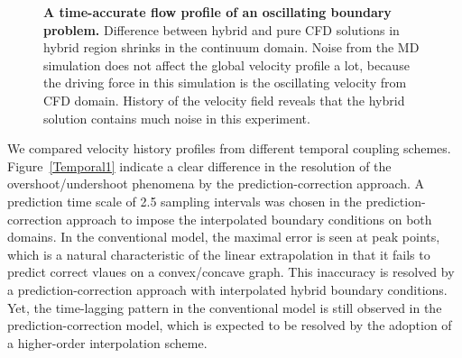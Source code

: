 \documentclass[preprint,12pt]{elsarticle}
\begin{document}
\begin{figure}
\centering
{}
\hskip 1cm
\vskip-0.2cm
\caption[]{\small {\bf A time-accurate flow profile of an oscillating boundary problem.}
 Difference between hybrid and pure CFD solutions in hybrid region shrinks in the continuum domain. Noise from the MD simulation does not affect the global velocity profile a lot, because the driving force in this simulation is the oscillating velocity from CFD domain.
 History of the velocity field reveals that the hybrid solution contains much noise in this experiment.}
\label{Stokes_Sol}
\end{figure}


We compared velocity history profiles from different temporal coupling schemes. Figure~\ref{Temporal1} indicate a clear difference in the resolution of the overshoot/undershoot phenomena by the prediction-correction approach. A prediction time scale of 2.5 sampling intervals was chosen in the prediction-correction approach to impose the interpolated boundary conditions on both domains. In the conventional model, the maximal error is seen at peak points, which is a natural characteristic of the linear extrapolation in that it fails to predict correct vlaues on a convex/concave graph. This inaccuracy is resolved by a prediction-correction approach with interpolated hybrid boundary conditions. Yet, the time-lagging pattern in the conventional model is still observed in the prediction-correction model, which is expected to be resolved by the adoption of a higher-order interpolation scheme.
\end{document}
